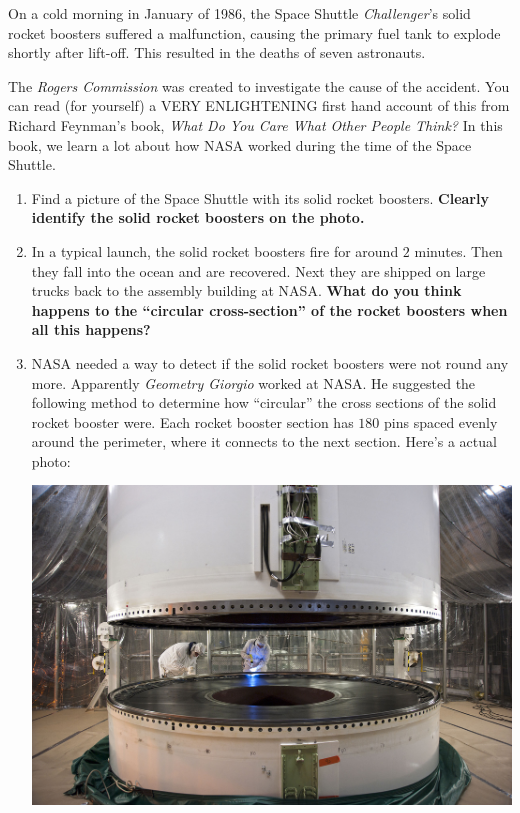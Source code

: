 \documentclass[nooutcomes,noauthor,hints,handout]{ximera}
\begin{document}
\begin{question}
  On a cold morning in January of 1986, the Space Shuttle
  \textit{Challenger}'s solid rocket boosters suffered a malfunction,
  causing the primary fuel tank to explode shortly after lift-off.
  This resulted in the deaths of seven astronauts. 


  The \textit{Rogers Commission} was created to investigate the cause
  of the accident.  You can read (for yourself) a VERY ENLIGHTENING
  first hand account of this from Richard Feynman's book, \textit{What
    Do You Care What Other People Think?} In this book, we learn a lot
  about how NASA worked during the time of the Space Shuttle.

  \begin{enumerate}
  \item Find a picture of the Space Shuttle with its solid rocket
    boosters. \textbf{Clearly identify the solid rocket boosters on the photo.}
  \item In a typical launch, the solid rocket boosters fire for around
    $2$ minutes. Then they fall into the ocean and are recovered. Next
    they are shipped on large trucks back to the assembly
    building at NASA. \textbf{What do you think happens to the ``circular
    cross-section'' of the rocket boosters when all this happens?}
  \item NASA needed a way to detect if the solid rocket boosters were
    not round any more. Apparently \textit{Geometry Giorgio} worked at
    NASA. He suggested the following method to determine how
    ``circular'' the cross sections of the solid rocket booster
    were. Each rocket booster section has $180$ pins spaced evenly
    around the perimeter, where it connects to the next
    section. Here's a actual photo:
    \begin{center}%
      \includegraphics[width=.6\textwidth]{srbSections.jpg}

\end{center}
\end{enumerate}
\end{question}
\end{document}
